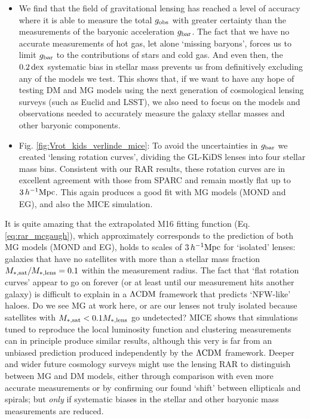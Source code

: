 \documentclass[usenatbib]{mnras}
\newcommand{\hMpc}{\, h^{-1}{\rm{Mpc}} }
\newcommand{\lcdm}{{\rm \Lambda CDM}}
\newcommand{\un}[1]{_{\rm #1}}
\newcommand{\dex}{\, {\rm dex}}
\begin{document}
\begin{itemize}
	\item We find that the field of gravitational lensing has reached a level of accuracy where it is able to measure the total $g\un{obs}$ with greater certainty than the measurements of the baryonic acceleration $g\un{bar}$. The fact that we have no accurate measurements of hot gas, let alone `missing baryons', forces us to limit $g\un{bar}$ to the contributions of stars and cold gas. And even then, the $0.2 \dex$ systematic bias in stellar mass prevents us from definitively excluding any of the models we test. This shows that, if we want to have any hope of testing DM and MG models using the next generation of cosmological lensing surveys (such as Euclid and LSST), we also need to focus on the models and observations needed to accurately measure the galaxy stellar masses and other baryonic components.
	
	\item Fig. \ref{fig:Vrot_kids_verlinde_mice}: To avoid the uncertainties in $g\un{bar}$ we created `lensing rotation curves', dividing the GL-KiDS lenses into four stellar mass bins. Consistent with our RAR results, these rotation curves are in excellent agreement with those from SPARC and remain mostly flat up to $3 \hMpc$. This again produces a good fit with MG models (MOND and EG), and also the MICE simulation.
\end{itemize}

It is quite amazing that the extrapolated M16 fitting function (Eq. \ref{eq:rar_mcgaugh}), which approximately corresponds to the prediction of both MG models (MOND and EG), holds to scales of $3 \hMpc$ for `isolated' lenses: galaxies that have no satellites with more than a stellar mass fraction $M\un{*,sat}/M\un{*,lens}=0.1$ within the measurement radius. The fact that `flat rotation curves' appear to go on forever (or at least until our measurement hits another galaxy) is difficult to explain in a $\lcdm$ framework that predicts `NFW-like' haloes. Do we see MG at work here, or are our lenses not truly isolated because satellites with $M\un{*,sat} < 0.1 M\un{*,lens}$ go undetected? MICE shows that simulations tuned to reproduce the local luminosity function and clustering measurements can in principle produce similar results, although this very is far from an unbiased prediction produced independently by the $\lcdm$ framework. Deeper and wider future cosmology surveys might use the lensing RAR to distinguish between MG and DM models, either through comparison with even more accurate measurements or by confirming our found `shift' between ellipticals and spirals; but \emph{only} if systematic biases in the stellar and other baryonic mass measurements are reduced.
\end{document}
